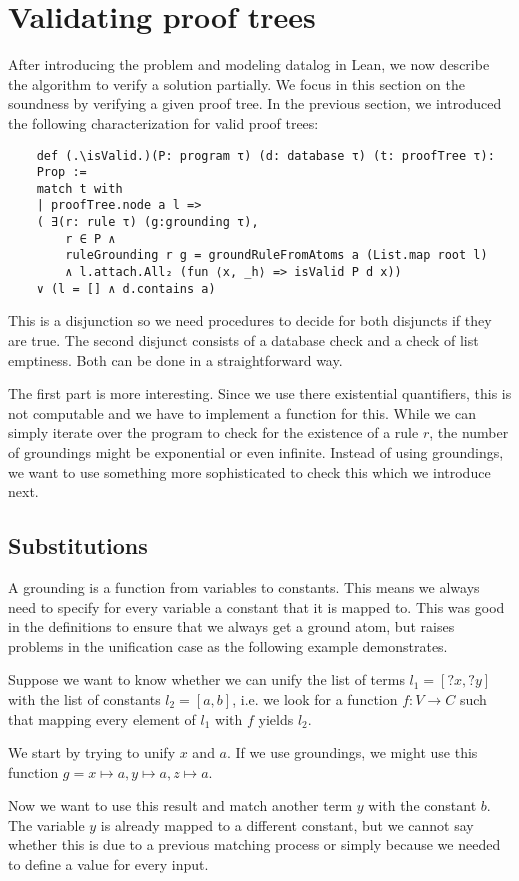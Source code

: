 \section{Validating proof trees}\label{sec:valTree}

After introducing the problem and modeling datalog in Lean, we now describe the algorithm to verify a solution partially. We focus in this section on the soundness by verifying a given proof tree. In the previous section, we introduced the following characterization for valid proof trees:

\begin{lstlisting}
    def (.\isValid.)(P: program τ) (d: database τ) (t: proofTree τ): 
    Prop :=
    match t with
    | proofTree.node a l => 
    ( ∃(r: rule τ) (g:grounding τ), 
        r ∈ P ∧ 
        ruleGrounding r g = groundRuleFromAtoms a (List.map root l)
        ∧ l.attach.All₂ (fun ⟨x, _h⟩ => isValid P d x)) 
    ∨ (l = [] ∧ d.contains a)
\end{lstlisting}

This is a disjunction so we need procedures to decide for both disjuncts if they are true.
The second disjunct consists of a database check and a check of list emptiness. Both can be done in a straightforward way.

The first part is more interesting. Since we use there existential quantifiers, this is not computable and we have to implement a function for this. While we can simply iterate over the program to check for the existence of a rule $r$, the number of groundings might be exponential or even infinite. Instead of using groundings, we want to use something more sophisticated to check this which we introduce next.


\subsection{Substitutions}
    A grounding is a function from variables to constants. This means we always need to specify for every variable a constant that it is mapped to. This was good in the definitions to ensure that we always get a ground atom, but raises problems in the unification case as the following example demonstrates.

    \begin{example}\label{ex:subsGroun}
        Suppose we want to know whether we can unify the list of terms $l_1 = [?x, ?y]$ with the list of constants $l_2= [a,b]$, i.e. we look for a function $f: V \to C$ such that mapping every element of $l_1$ with $f$ yields $l_2$.

        We start by trying to unify $x$ and $a$. If we use groundings, we might use this function $g = x \mapsto a, y \mapsto a, z \mapsto a$.

        Now we want to use this result and match another term $y$ with the constant $b$. The variable $y$ is already mapped to a different constant, but we cannot say whether this is due to a previous matching process or simply because we needed to define a value for every input.         
    \end{example}
    
